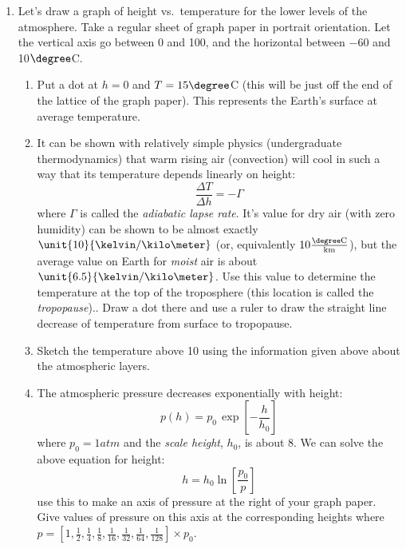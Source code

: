 \documentclass[12pt]{article}
\begin{document}
\begin{enumerate}

\item Let's draw a graph of height vs.\ temperature for the lower levels of the atmosphere. Take a regular sheet of graph paper in portrait orientation. Let the vertical axis go between 0 and \unit{100}{\kilo\meter}, and the horizontal between $-60$ and 10$\degree$C.  
	\begin{enumerate}
	\item Put a dot at $h=0$ and $T=15\degree$C (this will be just off the end of the lattice of the graph paper).  This represents the Earth's surface at average temperature.
	\item It can be shown with relatively simple physics (undergraduate thermodynamics) that warm rising air (convection) will cool in such a way that its temperature depends linearly on height:
		\begin{equation*}
		\frac{\Delta T}{\Delta h} = - \Gamma 
		\end{equation*}
	where $\Gamma$ is called the {\em adiabatic lapse rate}.  It's value for dry air (with zero humidity) can be shown to be almost exactly $\unit{10}{\kelvin/\kilo\meter}$ (or, equivalently $10 \frac{\degree\text{C}}{\text{km}}$), but the average value on Earth for {\em moist} air is about  $\unit{6.5}{\kelvin/\kilo\meter}$.  Use this value to determine the temperature at the top of the troposphere (this location is called the {\em tropopause})..  Draw a dot there and use a ruler to draw the straight line decrease of temperature from surface to tropopause.
	\item Sketch the temperature above \unit{10}{\kilo\meter} using the information given above about the atmospheric layers.
	\item The atmospheric pressure decreases exponentially with height:
		\begin{equation*}
		p(h) = p_0 \, \exp \left[ -\frac{h}{h_0} \right]
		\end{equation*}
	where $p_0 = \unit{1}{atm}$ and the {\em scale height}, $h_0$, is about \unit{8}{\kilo\meter}.  We can solve the above equation for height:
		\begin{equation*}
		h = h_0 \ln \left[ \frac{p_0}{p} \right]
		\end{equation*}
	use this to make an axis of pressure at the right of your graph paper.  Give values of pressure on this axis at the corresponding heights where $p =  \left[ 1, \frac{1}{2}, \frac{1}{4}, \frac{1}{8}, \frac{1}{16}, \frac{1}{32}, \frac{1}{64}, \frac{1}{128} \right] \times p_0$.
	\end{enumerate}


\end{enumerate}
\end{document}
